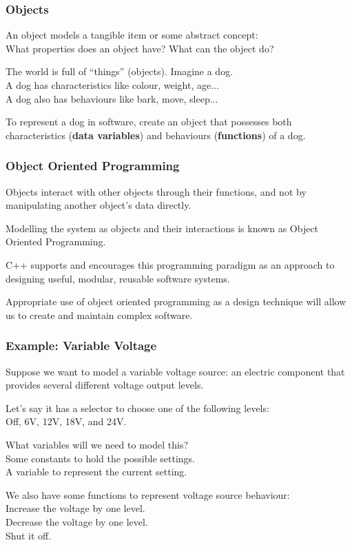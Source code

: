 \begin{frame}
\frametitle{Objects}



An object models a tangible item or some abstract concept:\\
\quad What properties does an object have? What can the object do?

The world is full of ``things'' (objects). Imagine a dog.\\
\quad A dog has characteristics like colour, weight, age...\\
\quad A dog also has behaviours like bark, move, sleep...

To represent a dog in software, create an object that possesses both characteristics (\textbf{data variables}) and behaviours (\textbf{functions}) of a dog.


\end{frame}

\begin{frame}
\frametitle{Object Oriented Programming}

Objects interact with other objects through their functions, and not by manipulating another object's data directly.

Modelling the system as objects and their interactions is known as \alert{Object Oriented Programming}.

C++ supports and encourages this programming paradigm as an approach to designing useful, modular, reusable software systems.

Appropriate use of object oriented programming as a design technique will allow us to create and maintain complex software.

\end{frame}

\begin{frame}
\frametitle{Example: Variable Voltage}
Suppose we want to model a variable voltage source: an electric component that provides several different voltage output levels. 

Let's say it has a selector to choose one of the following levels:\\
\quad Off, 6V, 12V, 18V, and 24V.

What variables will we need to model this?\\
\quad Some constants to hold the possible settings.\\
\quad A variable to represent the current setting.

We also have some functions to represent voltage source behaviour:\\
\quad Increase the voltage by one level.\\
\quad Decrease the voltage by one level.\\
\quad Shut it off.\\


\end{frame}


